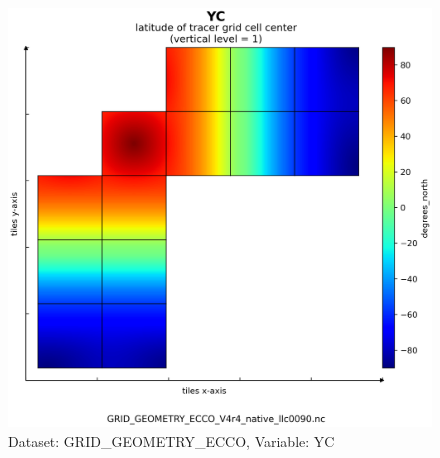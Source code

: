 \begin{figure}[H]
\centering
\includegraphics[scale=0.55]{../images/plots/v4r4/native_plots_coords/Geometry_Parameters_for_the_Lat-Lon-Cap_90_(llc90)_Native_Model_Grid_(Version_4_Release_4)/YC.png}
\caption{Dataset: GRID\_GEOMETRY\_ECCO, Variable: YC}
\label{tab:table-GRID_GEOMETRY_ECCO_YC-Plot}
\end{figure}
\newpage
\pagebreak
